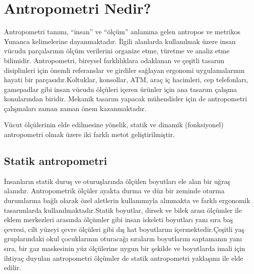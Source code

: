 \documentclass[11pt,a4paper]{report}
\begin{document}
		\section{Antropometri Nedir?}
	Antropometri tanımı, “insan” ve “ölçüm” anlamına gelen antropos ve metrikos Yunanca kelimelerine dayanmaktadır. İlgili alanlarda kullanılmak üzere insan vücudu parçalarının ölçüm verilerini organize etme, türetme ve analiz etme bilimidir.
	Antropometri, bireysel farklılıklara odaklanan ve çeşitli tasarım disiplinleri için önemli referanslar ve girdiler sağlayan ergonomi uygulamalarının hayati bir parçasıdır.Koltuklar, konsollar, ATM, araç iç hacimleri, cep telefonları, gamepadlar gibi insan vücudu ölçüleri içeren ürünler için ana tasarım çalışma konularından biridir. Mekanik tasarım yapacak mühendisler için de antropometri çalışmaları zaman zaman önem kazanmaktadır.\cite{antropometrinedir}
	
	Vücut ölçülerinin elde edilmesine yönelik, statik ve dinamik (fonksiyonel) antropometri olmak üzere iki farklı metot geliştirilmiştir.
	
	\subsection{Statik antropometri}İnsanların statik duruş ve oturuşlarında ölçülen boyutları ele alan bir uğraş alanıdır. Antropometrik ölçüler ayakta durma ve düz bir zeminde oturma durumlarına bağlı olarak özel aletlerin kullanımıyla alınmakta ve farklı ergonomik tasarımlarda kullanılmaktadır.Statik boyutlar, dirsek ve bilek arası ölçümler ile eklem merkezleri arasında ölçümler gibi insan iskeleti boyutları yanı sıra baş çevresi, cilt yüzeyi çevre ölçüleri gibi dış hat boyutlarını içermektedir.Çeşitli yaş gruplarındaki okul çocuklarının oturacağı sıraların boyutlarını saptamanın yanı sıra, bir gaz maskesinin yüz ölçülerine uygun bir şekilde ve boyutlarda imali için ihtiyaç duyulan antropometri ölçümler de statik antropometri yaklaşımı ile elde edilir.
\end{document}
